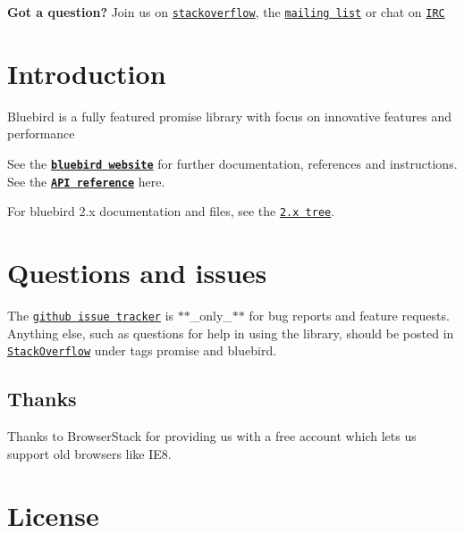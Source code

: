 \href{http://promisesaplus.com/}{\tt } \href{https://travis-ci.org/petkaantonov/bluebird}{\tt } \href{http://petkaantonov.github.io/bluebird/coverage/debug/index.html}{\tt }

{\bfseries Got a question?} Join us on \href{http://stackoverflow.com/questions/tagged/bluebird}{\tt stackoverflow}, the \href{https://groups.google.com/forum/#!forum/bluebird-js}{\tt mailing list} or chat on \href{https://webchat.freenode.net/?channels=#promises}{\tt I\+RC}

\section*{Introduction}

Bluebird is a fully featured promise library with focus on innovative features and performance

See the \href{http://bluebirdjs.com/docs/getting-started.html}{\tt {\bfseries bluebird website}} for further documentation, references and instructions. See the \href{http://bluebirdjs.com/docs/api-reference.html}{\tt {\bfseries A\+PI reference}} here.

For bluebird 2.\+x documentation and files, see the \href{https://github.com/petkaantonov/bluebird/tree/2.x}{\tt 2.\+x tree}.

\section*{Questions and issues}

The \href{https://github.com/petkaantonov/bluebird/issues}{\tt github issue tracker} is $\ast$$\ast$\+\_\+only\+\_\+$\ast$$\ast$ for bug reports and feature requests. Anything else, such as questions for help in using the library, should be posted in \href{http://stackoverflow.com/questions/tagged/bluebird}{\tt Stack\+Overflow} under tags {\ttfamily promise} and {\ttfamily bluebird}.

\subsection*{Thanks}

Thanks to Browser\+Stack for providing us with a free account which lets us support old browsers like I\+E8.

\section*{License}

